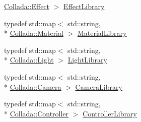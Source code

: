 \begin{DoxyCompactItemize}
\hyperlink{struct_assimp_1_1_collada_1_1_effect}{Collada\+::\+Effect} $>$ \hyperlink{class_assimp_1_1_collada_parser_a22fbbae8a9f57784034d89f1c8569515}{Effect\+Library}
\item 
typedef std\+::map$<$ std\+::string, \\*
\hyperlink{struct_assimp_1_1_collada_1_1_material}{Collada\+::\+Material} $>$ \hyperlink{class_assimp_1_1_collada_parser_ade2fe0008281313e1e5d4ba71fc8f0aa}{Material\+Library}
\item 
typedef std\+::map$<$ std\+::string, \\*
\hyperlink{struct_assimp_1_1_collada_1_1_light}{Collada\+::\+Light} $>$ \hyperlink{class_assimp_1_1_collada_parser_a873173a2311c52691fb25d153f376542}{Light\+Library}
\item 
typedef std\+::map$<$ std\+::string, \\*
\hyperlink{struct_assimp_1_1_collada_1_1_camera}{Collada\+::\+Camera} $>$ \hyperlink{class_assimp_1_1_collada_parser_a682434e214b9d9831166f0ac55b1aed4}{Camera\+Library}
\item 
typedef std\+::map$<$ std\+::string, \\*
\hyperlink{struct_assimp_1_1_collada_1_1_controller}{Collada\+::\+Controller} $>$ \hyperlink{class_assimp_1_1_collada_parser_a2e216f3a8cc9f2953967c5ae59bed7c9}{Controller\+Library}
\end{DoxyCompactItemize}
